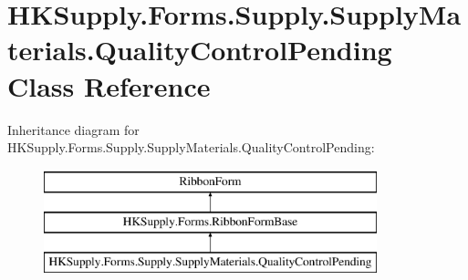 \hypertarget{class_h_k_supply_1_1_forms_1_1_supply_1_1_supply_materials_1_1_quality_control_pending}{}\section{H\+K\+Supply.\+Forms.\+Supply.\+Supply\+Materials.\+Quality\+Control\+Pending Class Reference}
\label{class_h_k_supply_1_1_forms_1_1_supply_1_1_supply_materials_1_1_quality_control_pending}
Inheritance diagram for H\+K\+Supply.\+Forms.\+Supply.\+Supply\+Materials.\+Quality\+Control\+Pending\+:\begin{figure}[H]
\begin{center}
\leavevmode
\includegraphics[height=3.000000cm]{class_h_k_supply_1_1_forms_1_1_supply_1_1_supply_materials_1_1_quality_control_pending}
\end{center}
\end{figure}
